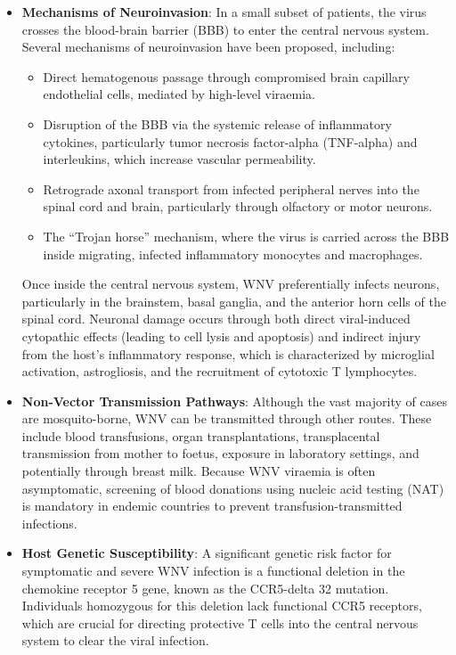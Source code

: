 \begin{itemize}
    \item \textbf{Mechanisms of Neuroinvasion}: In a small subset of patients, the virus crosses the blood-brain barrier (BBB) to enter the central nervous system. Several mechanisms of neuroinvasion have been proposed, including:
    \begin{itemize}
        \item Direct hematogenous passage through compromised brain capillary endothelial cells, mediated by high-level viraemia.
        \item Disruption of the BBB via the systemic release of inflammatory cytokines, particularly tumor necrosis factor-alpha (TNF-alpha) and interleukins, which increase vascular permeability.
        \item Retrograde axonal transport from infected peripheral nerves into the spinal cord and brain, particularly through olfactory or motor neurons.
        \item The ``Trojan horse'' mechanism, where the virus is carried across the BBB inside migrating, infected inflammatory monocytes and macrophages.
    \end{itemize}
    Once inside the central nervous system, WNV preferentially infects neurons, particularly in the brainstem, basal ganglia, and the anterior horn cells of the spinal cord. Neuronal damage occurs through both direct viral-induced cytopathic effects (leading to cell lysis and apoptosis) and indirect injury from the host's inflammatory response, which is characterized by microglial activation, astrogliosis, and the recruitment of cytotoxic T lymphocytes.
    \item \textbf{Non-Vector Transmission Pathways}: Although the vast majority of cases are mosquito-borne, WNV can be transmitted through other routes. These include blood transfusions, organ transplantations, transplacental transmission from mother to foetus, exposure in laboratory settings, and potentially through breast milk. Because WNV viraemia is often asymptomatic, screening of blood donations using nucleic acid testing (NAT) is mandatory in endemic countries to prevent transfusion-transmitted infections.
    \item \textbf{Host Genetic Susceptibility}: A significant genetic risk factor for symptomatic and severe WNV infection is a functional deletion in the chemokine receptor 5 gene, known as the CCR5-delta 32 mutation. Individuals homozygous for this deletion lack functional CCR5 receptors, which are crucial for directing protective T cells into the central nervous system to clear the viral infection.
\end{itemize}

